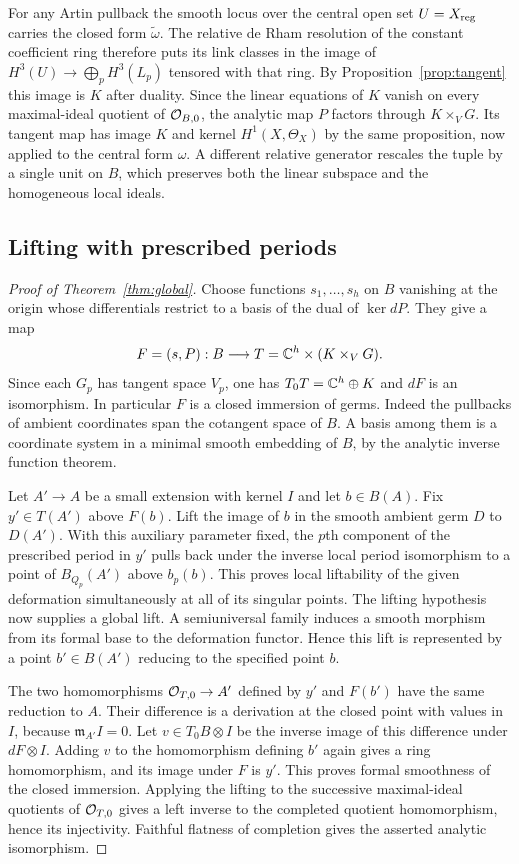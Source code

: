 For any Artin pullback the smooth locus over the central open set
$U=X_{\rm reg}$ carries the closed form $\widetilde\omega$.
The relative de Rham resolution of the constant coefficient ring
therefore puts its link classes in the image of $H^3(U)\to
\bigoplus_p H^3(L_p)$ tensored with that ring. By
Proposition~\ref{prop:tangent} this image is $K$ after duality.
Since the linear equations of $K$ vanish on every maximal-ideal
quotient of $\mathcal O_{B,0}$, the analytic map $P$ factors through
$K\times_V G$. Its tangent map has image $K$ and kernel
$H^1(X,\Theta_X)$ by the same proposition, now applied to the
central form $\omega$. A different relative generator rescales the
tuple by a single unit on $B$, which preserves both the linear
subspace and the homogeneous local ideals.

\subsection{Lifting with prescribed periods}
\begin{proof}[Proof of Theorem~\ref{thm:global}]
Choose functions $s_1,\ldots,s_h$ on $B$ vanishing at the origin
whose differentials restrict to a basis of the dual of $\ker dP$.
They give a map
\[
 F=(s,P):B\longrightarrow T=\mathbb C^h\times (K\times_V G).
\]
Since each $G_p$ has tangent space $V_p$, one has
$T_0T=\mathbb C^h\oplus K$ and $dF$ is an isomorphism. In particular $F$
is a closed immersion of germs. Indeed the pullbacks of ambient
coordinates span the cotangent space of $B$. A basis among them is a
coordinate system in a minimal smooth embedding of $B$, by the
analytic inverse function theorem.

Let $A'\to A$ be a small extension with kernel $I$ and let $b\in B(A)$.
Fix $y'\in T(A')$ above $F(b)$. Lift the image of $b$ in the
smooth ambient germ $D$ to $D(A')$. With this auxiliary parameter
fixed, the $p$th component of the prescribed period in $y'$ pulls
back under the inverse local period isomorphism to a point of
$B_{Q_p}(A')$ above $b_p(b)$. This proves local liftability of the
given deformation simultaneously at all of its singular points.
The lifting hypothesis now supplies a global lift. A semiuniversal
family induces a smooth morphism from its formal base to the
deformation functor. Hence this lift is represented by a point
$b'\in B(A')$ reducing to the specified point $b$.

The two homomorphisms $\mathcal O_{T,0}\to A'$ defined by $y'$ and
$F(b')$ have the same reduction to $A$. Their difference is a
derivation at the closed point with values in $I$, because
$\mathfrak m_{A'} I=0$. Let $v\in T_0B\otimes I$ be the inverse
image of this difference under $dF\otimes I$. Adding $v$ to the
homomorphism defining $b'$ again gives a ring homomorphism, and
its image under $F$ is $y'$. This proves formal smoothness of the
closed immersion. Applying the lifting to the successive
maximal-ideal quotients of $\mathcal O_{T,0}$ gives a left inverse to the
completed quotient homomorphism, hence its injectivity.
Faithful flatness of completion gives the asserted analytic
isomorphism.
\end{proof}

